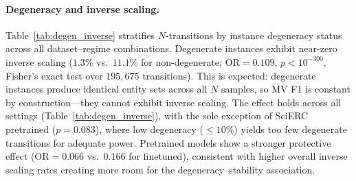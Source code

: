 \paragraph{Degeneracy and inverse scaling.}\label{app:degen_inverse}
Table~\ref{tab:degen_inverse} stratifies $N$-transitions by instance degeneracy status across all dataset--regime combinations.
Degenerate instances exhibit near-zero inverse scaling ($1.3$\% vs.\ $11.1$\% for non-degenerate; OR${=}0.109$, $p{<}10^{-300}$, Fisher's exact test over $195{,}675$ transitions).
This is expected: degenerate instances produce identical entity sets across all $N$ samples, so MV F1 is constant by construction---they cannot exhibit inverse scaling.
The effect holds across all settings (Table~\ref{tab:degen_inverse}), with the sole exception of SciERC pretrained ($p{=}0.083$), where low degeneracy (${\leq}10$\%) yields too few degenerate transitions for adequate power.
Pretrained models show a stronger protective effect (OR${=}0.066$ vs.\ $0.166$ for finetuned), consistent with higher overall inverse scaling rates creating more room for the degeneracy--stability association.

\begin{table}[t]
\centering
\small
\caption{Inverse scaling rate by degeneracy status. An $N{\to}N'$ transition is ``inverse'' if MV F1 at $N'$ is strictly lower than at $N$. OR: odds ratio (Fisher's exact test).}
\label{tab:degen_inverse}
\end{table}

